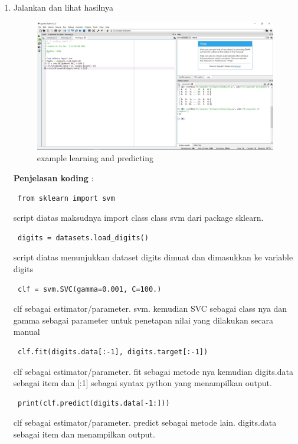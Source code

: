 \begin{enumerate}
		\item{Jalankan dan lihat hasilnya}
        \begin{figure}[H]
		\centering
		\includegraphics[width=1\textwidth]{figures/1184095/chapter1/7.JPG}
		\caption{example learning and predicting}
		\label{print}
		\end{figure}
		
		\textbf{Penjelasan koding} :
		
		
		\begin{verbatim} from sklearn import svm \end{verbatim} script diatas maksudnya import class class svm dari package sklearn.
		
		\begin{verbatim} digits = datasets.load_digits() \end{verbatim} script diatas menunjukkan  dataset digits dimuat dan dimasukkan ke variable digits
			
		\begin{verbatim} clf = svm.SVC(gamma=0.001, C=100.)  \end{verbatim} clf sebagai estimator/parameter. svm. kemudian SVC sebagai class nya dan gamma sebagai parameter untuk penetapan nilai yang dilakukan secara manual

		
		\begin{verbatim} clf.fit(digits.data[:-1], digits.target[:-1])  \end{verbatim} clf sebagai estimator/parameter. fit sebagai metode nya kemudian digits.data sebagai item dan [:1] sebagai syntax python yang menampilkan output.
		
		\begin{verbatim} print(clf.predict(digits.data[-1:]))  \end{verbatim} clf sebagai estimator/parameter. predict sebagai metode lain. digits.data sebagai item dan menampilkan output.
		

\end{enumerate}
